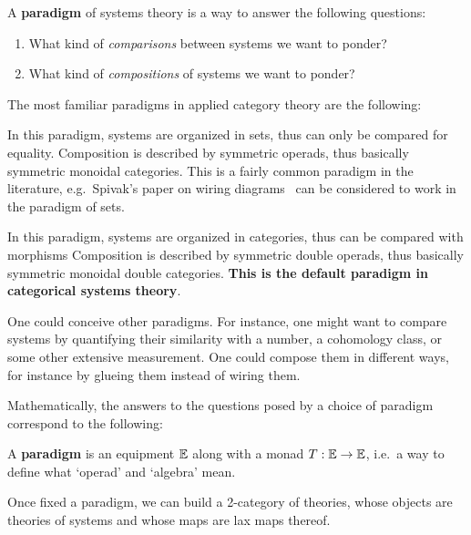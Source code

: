 \begin{definition}[Paradigm]
	A \textbf{paradigm} of systems theory is a way to answer the following questions:
	\begin{enumerate}
		\item What kind of \emph{comparisons} between systems we want to ponder?
		\item What kind of \emph{compositions} of systems we want to ponder?
	\end{enumerate}
\end{definition}

The most familiar paradigms in applied category theory are the following:

\begin{example}
	In this paradigm, systems are organized in sets, thus can only be compared for equality.
	Composition is described by symmetric operads, thus basically symmetric monoidal categories.
	This is a fairly common paradigm in the literature, e.g.~Spivak's paper on wiring diagrams~\cite{spivak2013operad} can be considered to work in the paradigm of sets.
\end{example}

\begin{example}
	In this paradigm, systems are organized in categories, thus can be compared with morphisms
	Composition is described by symmetric double operads, thus basically symmetric monoidal double categories.
	\textbf{This is the default paradigm in categorical systems theory}.
\end{example}

One could conceive other paradigms.
For instance, one might want to compare systems by quantifying their similarity with a number, a cohomology class, or some other extensive measurement.
One could compose them in different ways, for instance by glueing them instead of wiring them.

Mathematically, the answers to the questions posed by a choice of paradigm correspond to the following:

\begin{definition}[Paradigm]
	A \textbf{paradigm} is an equipment $\dblcat E$ along with a monad $T:\dblcat{E} \to \dblcat{E}$, i.e.~a way to define what `operad' and `algebra' mean.
\end{definition}

Once fixed a paradigm, we can build a 2-category of theories, whose objects are theories of systems and whose maps are lax maps thereof.

